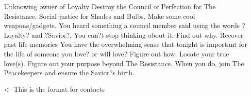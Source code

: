 \documentclass[char]{Silversiders}
\begin{document}
\name{\cIngenuity{}}

Unknowing owner of Loyalty
Destroy the Council of Perfection for The Resistance.
Social justice for Shades and Bulbs. Make some cool weapons/gadgets.
You heard something a council member said using the words ?Loyalty? and ?Savior?. You can?t stop thinking about it. Find out why.
Recover past life memories
You have the overwhelming sense that tonight is important for the life of someone you love? or will love? Figure out how. 
Locate your true love(s).
Figure out your purpose beyond The Resistance.
When you do, join The Peacekeepers and ensure the Savior?s birth.

\begin{itemz}[Goals]
	\item 
\end{itemz}

\begin{itemz}[Notes]
	\item 
\end{itemz}

\begin{contacts}
	\contact{\cTest{}} <- This is the format for contacts 
\end{contacts}
\end{document}
